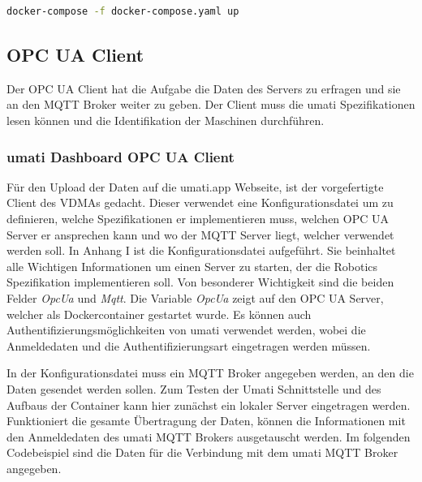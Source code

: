 \documentclass[a4paper, 12pt, oneside]{scrbook}
\begin{document}
			\begin{lstlisting}[numbers=none, language=bash, frame=single]
docker-compose -f docker-compose.yaml up
			\end{lstlisting}
			
			
		\subsection{OPC UA Client}
		
		Der OPC UA Client hat die Aufgabe die Daten des Servers zu erfragen und sie an den MQTT Broker weiter zu geben. Der Client muss die umati Spezifikationen lesen können und die Identifikation der Maschinen durchführen.
		
			\subsubsection{umati Dashboard OPC UA Client}
			
			Für den Upload der Daten auf die umati.app Webseite, ist der vorgefertigte Client des VDMAs gedacht. Dieser verwendet eine Konfigurationsdatei um zu definieren, welche Spezifikationen er implementieren muss, welchen OPC UA Server er ansprechen kann und wo der MQTT Server liegt, welcher verwendet werden soll. In Anhang I ist die Konfigurationsdatei aufgeführt. Sie beinhaltet alle Wichtigen Informationen um einen Server zu starten, der die Robotics Spezifikation implementieren soll. Von besonderer Wichtigkeit sind die beiden Felder \textit{OpcUa} und \textit{Mqtt}. Die Variable \textit{OpcUa} zeigt auf den OPC UA Server, welcher als Dockercontainer gestartet wurde. Es können auch Authentifizierungsmöglichkeiten von umati verwendet werden, wobei die Anmeldedaten und die Authentifizierungsart eingetragen werden müssen.
			
			
			
			In der Konfigurationsdatei muss ein MQTT Broker angegeben werden, an den die Daten gesendet werden sollen. Zum Testen der Umati Schnittstelle und des Aufbaus der Container kann hier zunächst ein lokaler Server eingetragen werden. Funktioniert die gesamte Übertragung der Daten, können die Informationen mit den Anmeldedaten des umati MQTT Brokers ausgetauscht werden. Im folgenden Codebeispiel sind die Daten für die Verbindung mit dem umati MQTT Broker angegeben.
			
			
			
\end{document}
